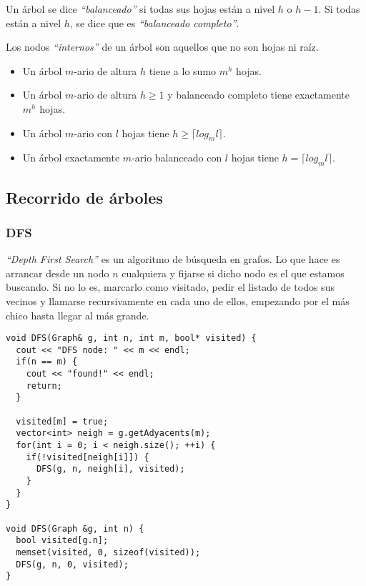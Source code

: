 Un \'arbol se dice \emph{``balanceado''} si todas sus hojas est\'an a nivel $h$ o $h-1$. Si todas est\'an a nivel $h$, se dice que es \emph{``balanceado completo''}.

Los nodos \emph{``internos''} de un \'arbol son aquellos que no son hojas ni ra\'iz.

\begin{itemize}
\item Un \'arbol $m$-ario de altura $h$ tiene a lo sumo $m^h$ hojas. 
\item Un \'arbol $m$-ario de altura $h \geq 1$ y balanceado completo tiene exactamente $m^h$ hojas.
\item Un \'arbol $m$-ario con $l$ hojas tiene $h \geq \lceil log_{m}l \rceil$.
\item Un \'arbol exactamente $m$-ario balanceado con $l$ hojas tiene $h = \lceil log_{m}l \rceil$.
\end{itemize}

\subsection{Recorrido de \'arboles}
\subsubsection{DFS}

\emph{``Depth First Search''} es un algoritmo de b\'usqueda en grafos. Lo que hace es arrancar desde un nodo $n$ cualquiera y fijarse si dicho nodo es el que estamos buscando. Si no lo es, marcarlo como visitado, pedir el listado de todos sus vecinos y llamarse recursivamente en cada uno de ellos, empezando por el m\'as chico hasta llegar al m\'as grande.
\vspace{8px}

\begin{center}
\begin{minipage}{0.90\textwidth}
\begin{lstlisting}[frame=lrtb]
void DFS(Graph& g, int n, int m, bool* visited) {
  cout << "DFS node: " << m << endl;
  if(n == m) {
    cout << "found!" << endl;
    return;
  }

  visited[m] = true;
  vector<int> neigh = g.getAdyacents(m);
  for(int i = 0; i < neigh.size(); ++i) {
    if(!visited[neigh[i]]) {
      DFS(g, n, neigh[i], visited);
    }
  }
}

void DFS(Graph &g, int n) {
  bool visited[g.n];
  memset(visited, 0, sizeof(visited));
  DFS(g, n, 0, visited);
}
\end{lstlisting}
\end{minipage}
\end{center}

